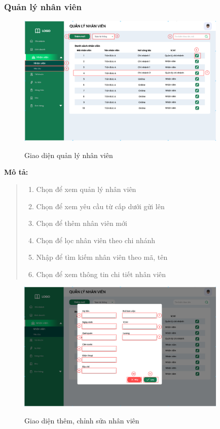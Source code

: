     \subsubsection{Quản lý nhân viên}
        \begin{figure}[!htp]
            \centering
            \includegraphics[width=10cm]{img/UI/admin/staff.png}
            \label{23}
            \newline
            \caption{Giao diện quản lý nhân viên}
        \end{figure}
        \textbf{Mô tả:}  
        \begin{quote}
            \begin{enumerate}
                \item Chọn để xem quản lý nhân viên
                \item Chọn để xem yêu cầu từ cấp dưới gửi lên
                \item Chọn để thêm nhân viên mới
                \item Chọn để lọc nhân viên theo chi nhánh
                \item Nhập để tìm kiếm nhân viên theo mã, tên
                \item Chọn để xem thông tin chi tiết nhân viên
            \end{enumerate}
        \end{quote}
            \begin{figure}[!htp]
                \centering
                \includegraphics[width=10cm]{img/UI/admin/staff_edit_add.png}
                \label{24}
                \newline
                \caption{Giao diện thêm, chỉnh sửa nhân viên}
            \end{figure}
